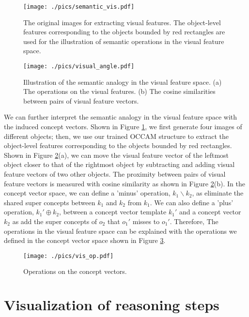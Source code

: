 \documentclass[10pt,twocolumn,letterpaper]{article}
\begin{document}
\begin{figure}
\centering
\texttt{[image: ./pics/semantic\_vis.pdf]}
\caption{The original images for extracting visual features. The object-level features corresponding to the objects bounded by red rectangles are used for the illustration of semantic operations in the visual feature space. }
\label{semantic_vis}
\end{figure}

\begin{figure}
\centering
\texttt{[image: ./pics/visual\_angle.pdf]}
\caption{Illustration of the semantic analogy in the visual feature space. (a) The operations on the visual features. (b) The cosine similarities between pairs of visual feature vectors. }
\label{visual_angle}
\end{figure}

We can further interpret the semantic analogy in the visual feature space with the induced concept vectors. Shown in Figure \ref{semantic_vis}, we first generate four images of different objects; then, we use our trained OCCAM structure to extract the object-level features corresponding to the objects bounded by red rectangles. Shown in Figure \ref{visual_angle}(a), we can move the visual feature vector of the leftmost object closer to that of the rightmost object by subtracting and adding visual feature vectors of two other objects. The proximity between pairs of visual feature vectors is measured with cosine similarity as shown in Figure \ref{visual_angle}(b). In the concept vector space, we can define a 'minus' operation, $k_1\backslash k_2$, as eliminate the shared super concepts between $k_1$ and $k_2$ from $k_1$. We can also define a 'plus' operation, $k_1' \oplus k_2$, between a concept vector template $k_1'$ and a concept vector $k_2$ as add the super concepts of $o_2$ that $o_1'$ misses to $o_1'$. Therefore, The operations in the visual feature space can be explained with the operations we defined in the concept vector space shown in Figure \ref{vis_op}.




\begin{figure}
\centering
\texttt{[image: ./pics/vis\_op.pdf]}
\caption{Operations on the concept vectors.}
\label{vis_op}
\end{figure}

\section{Visualization of reasoning steps}
\label{app:vis_concept_reasoning}
\end{document}
